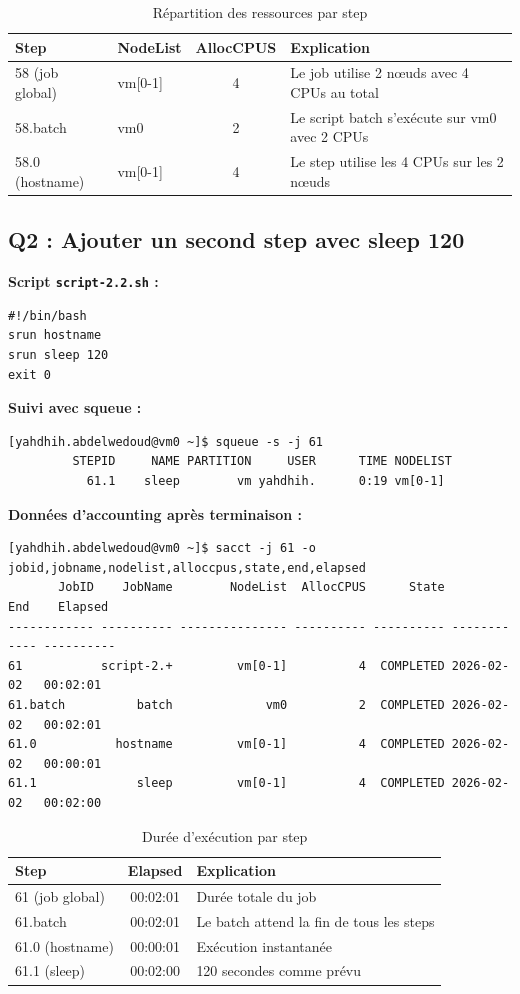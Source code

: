 \documentclass[12pt,a4paper]{article}
\newcommand{\code}[1]{\texttt{#1}}
\begin{document}
\begin{table}[h]
\centering
\begin{tabular}{|l|l|c|p{7cm}|}
\hline
\textbf{Step} & \textbf{NodeList} & \textbf{AllocCPUS} & \textbf{Explication} \\
\hline
58 (job global) & vm[0-1] & 4 & Le job utilise 2 nœuds avec 4 CPUs au total \\
58.batch & vm0 & 2 & Le script batch s'exécute sur vm0 avec 2 CPUs \\
58.0 (hostname) & vm[0-1] & 4 & Le step utilise les 4 CPUs sur les 2 nœuds \\
\hline
\end{tabular}
\caption{Répartition des ressources par step}
\end{table}

\subsection{Q2 : Ajouter un second step avec sleep 120}

\textbf{Script \code{script-2.2.sh} :}
\begin{lstlisting}
#!/bin/bash
srun hostname
srun sleep 120
exit 0
\end{lstlisting}

\textbf{Suivi avec squeue :}
\begin{lstlisting}
[yahdhih.abdelwedoud@vm0 ~]$ squeue -s -j 61
         STEPID     NAME PARTITION     USER      TIME NODELIST
           61.1    sleep        vm yahdhih.      0:19 vm[0-1]
\end{lstlisting}

\textbf{Données d'accounting après terminaison :}
\begin{lstlisting}
[yahdhih.abdelwedoud@vm0 ~]$ sacct -j 61 -o jobid,jobname,nodelist,alloccpus,state,end,elapsed
       JobID    JobName        NodeList  AllocCPUS      State          End    Elapsed 
------------ ---------- --------------- ---------- ---------- ------------ ---------- 
61           script-2.+         vm[0-1]          4  COMPLETED 2026-02-02   00:02:01 
61.batch          batch             vm0          2  COMPLETED 2026-02-02   00:02:01 
61.0           hostname         vm[0-1]          4  COMPLETED 2026-02-02   00:00:01 
61.1              sleep         vm[0-1]          4  COMPLETED 2026-02-02   00:02:00 
\end{lstlisting}

\begin{table}[h]
\centering
\begin{tabular}{|l|c|p{8cm}|}
\hline
\textbf{Step} & \textbf{Elapsed} & \textbf{Explication} \\
\hline
61 (job global) & 00:02:01 & Durée totale du job \\
61.batch & 00:02:01 & Le batch attend la fin de tous les steps \\
61.0 (hostname) & 00:00:01 & Exécution instantanée \\
61.1 (sleep) & 00:02:00 & 120 secondes comme prévu \\
\hline
\end{tabular}
\caption{Durée d'exécution par step}
\end{table}
\end{document}
